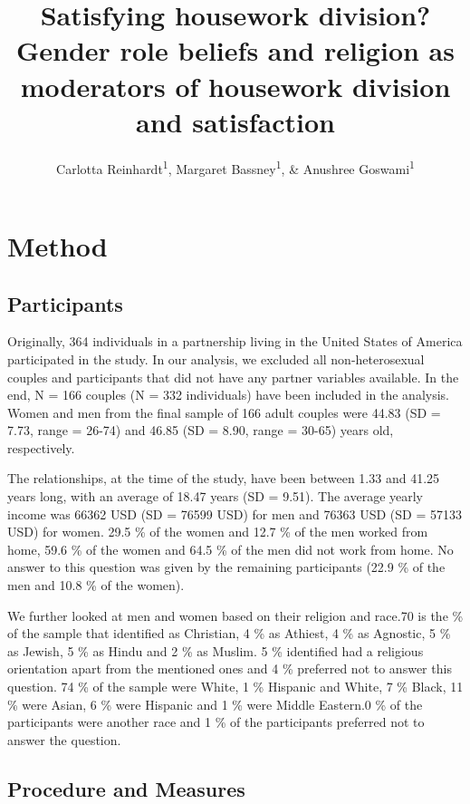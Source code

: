\documentclass[
  man]{apa6}
\title{Satisfying housework division? Gender role beliefs and religion as moderators of housework division and satisfaction}
\author{Carlotta Reinhardt\textsuperscript{1}, Margaret Bassney\textsuperscript{1}, \& Anushree Goswami\textsuperscript{1}}
\date{}
\affiliation{\vspace{0.5cm}\textsuperscript{1} Smith College}
\begin{document}
\maketitle

\hypertarget{method}{%
\section{Method}\label{method}}

\hypertarget{participants}{%
\subsection{Participants}\label{participants}}

Originally, 364 individuals in a partnership living in the United States of America participated in the study. In our analysis, we excluded all non-heterosexual couples and participants that did not have any partner variables available. In the end, N = 166 couples (N = 332 individuals) have been included in the analysis. Women and men from the final sample of 166 adult couples were 44.83 (SD = 7.73, range = 26-74) and 46.85 (SD = 8.90, range = 30-65) years old, respectively.

The relationships, at the time of the study, have been between 1.33 and 41.25 years long, with an average of 18.47 years (SD = 9.51). The average yearly income was 66362 USD (SD = 76599 USD) for men and 76363 USD (SD = 57133 USD) for women. 29.5 \% of the women and 12.7 \% of the men worked from home, 59.6 \% of the women and 64.5 \% of the men did not work from home. No answer to this question was given by the remaining participants (22.9 \% of the men and 10.8 \% of the women).

We further looked at men and women based on their religion and race.70 is the \% of the sample that identified as Christian, 4 \% as Athiest, 4 \% as Agnostic, 5 \% as Jewish, 5 \% as Hindu and 2 \% as Muslim. 5 \% identified had a religious orientation apart from the mentioned ones and 4 \% preferred not to answer this question.
74 \% of the sample were White, 1 \% Hispanic and White, 7 \% Black, 11 \% were Asian, 6 \% were Hispanic and 1 \% were Middle Eastern.0 \% of the participants were another race and 1 \% of the participants preferred not to answer the question.

\hypertarget{procedure-and-measures}{%
\subsection{Procedure and Measures}\label{procedure-and-measures}}
\end{document}
